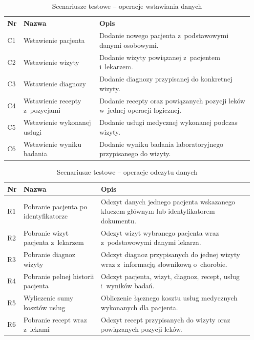 \documentclass[12pt,a4paper]{article}
\begin{document}
\begin{table}[H]
\centering
\caption{Scenariusze testowe -- operacje wstawiania danych}
\small
\begin{tabular}{@{}p{0.7cm}p{4cm}p{8.2cm}@{}}
\toprule
\textbf{Nr} & \textbf{Nazwa} & \textbf{Opis} \\
\midrule
C1 & Wstawienie pacjenta & Dodanie nowego pacjenta z~podstawowymi danymi osobowymi. \\
C2 & Wstawienie wizyty & Dodanie wizyty powiązanej z~pacjentem i~lekarzem. \\
C3 & Wstawienie diagnozy & Dodanie diagnozy przypisanej do konkretnej wizyty. \\
C4 & Wstawienie recepty z~pozycjami & Dodanie recepty oraz powiązanych pozycji leków w~jednej operacji logicznej. \\
C5 & Wstawienie wykonanej usługi & Dodanie usługi medycznej wykonanej podczas wizyty. \\
C6 & Wstawienie wyniku badania & Dodanie wyniku badania laboratoryjnego przypisanego do wizyty. \\
\bottomrule
\end{tabular}
\end{table}

\begin{table}[H]
\centering
\caption{Scenariusze testowe -- operacje odczytu danych}
\small
\begin{tabular}{@{}p{0.7cm}p{4cm}p{8.2cm}@{}}
\toprule
\textbf{Nr} & \textbf{Nazwa} & \textbf{Opis} \\
\midrule
R1 & Pobranie pacjenta po identyfikatorze & Odczyt danych jednego pacjenta wskazanego kluczem głównym lub identyfikatorem dokumentu. \\
R2 & Pobranie wizyt pacjenta z~lekarzem & Odczyt wizyt wybranego pacjenta wraz z~podstawowymi danymi lekarza. \\
R3 & Pobranie diagnoz wizyty & Odczyt diagnoz przypisanych do jednej wizyty wraz z~informacją słownikową o~chorobie. \\
R4 & Pobranie pełnej historii pacjenta & Odczyt pacjenta, wizyt, diagnoz, recept, usług i~wyników badań. \\
R5 & Wyliczenie sumy kosztów usług & Obliczenie łącznego kosztu usług medycznych wykonanych dla pacjenta. \\
R6 & Pobranie recept wraz z~lekami & Odczyt recept przypisanych do wizyty oraz powiązanych pozycji leków. \\
\bottomrule
\end{tabular}
\end{table}
\end{document}
